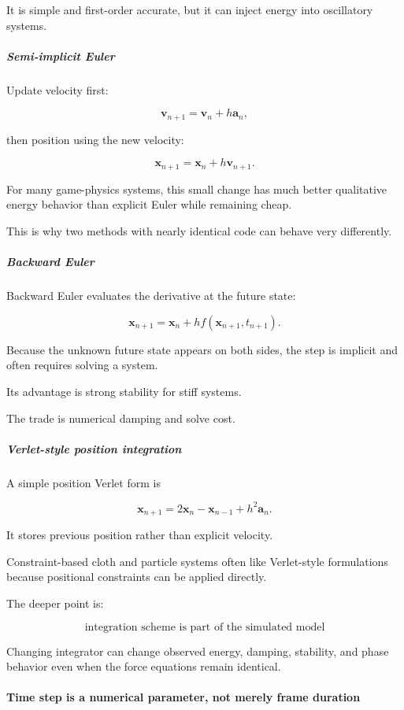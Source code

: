 It is simple and first-order accurate, but it can inject energy into oscillatory systems.

\subparagraph{Semi-implicit Euler}\label{semi-implicit-euler}

Update velocity first:

\[
\mathbf v_{n+1}
=
\mathbf v_n+h\mathbf a_n,
\]

then position using the new velocity:

\[
\mathbf x_{n+1}
=
\mathbf x_n+h\mathbf v_{n+1}.
\]

For many game-physics systems, this small change has much better qualitative energy behavior than explicit Euler while remaining cheap.

This is why two methods with nearly identical code can behave very differently.

\subparagraph{Backward Euler}\label{backward-euler}

Backward Euler evaluates the derivative at the future state:

\[
\mathbf x_{n+1}
=
\mathbf x_n
+
h f(\mathbf x_{n+1},t_{n+1}).
\]

Because the unknown future state appears on both sides, the step is implicit and often requires solving a system.

Its advantage is strong stability for stiff systems.

The trade is numerical damping and solve cost.

\subparagraph{Verlet-style position integration}\label{verlet-style-position-integration}

A simple position Verlet form is

\[
\mathbf x_{n+1}
=
2\mathbf x_n
-
\mathbf x_{n-1}
+
h^2\mathbf a_n.
\]

It stores previous position rather than explicit velocity.

Constraint-based cloth and particle systems often like Verlet-style formulations because positional constraints can be applied directly.

The deeper point is:

\[
\boxed{
\text{integration scheme is part of the simulated model}
}
\]

Changing integrator can change observed energy, damping, stability, and phase behavior even when the force equations remain identical.

\paragraph{Time step is a numerical parameter, not merely frame duration}\label{time-step-is-a-numerical-parameter-not-merely-frame-duration}

